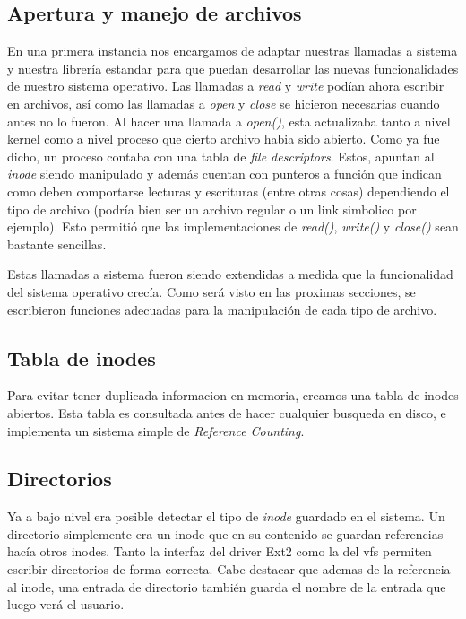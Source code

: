 \documentclass[a4paper,10pt]{article}
\begin{document}
\subsection{Apertura y manejo de archivos}
En una primera instancia nos encargamos de adaptar nuestras llamadas a sistema y nuestra librería estandar
para que puedan desarrollar las nuevas funcionalidades de nuestro sistema operativo.
Las llamadas a \textit{read} y \textit{write} podían ahora escribir en archivos, así como las llamadas a \textit{open} y \textit{close} se hicieron
necesarias cuando antes no lo fueron.
Al hacer una llamada a \textit{open()}, esta actualizaba tanto a nivel kernel como a nivel proceso que cierto archivo habia sido abierto. 
Como ya fue dicho, un proceso contaba con una tabla de \textit{file descriptors}. 
Estos, apuntan al \textit{inode} siendo manipulado y además cuentan con punteros a función que indican como deben comportarse lecturas y escrituras (entre otras cosas) dependiendo el tipo de archivo 
(podría bien ser un archivo regular o un link simbolico por ejemplo). 
Esto permitió que las implementaciones de \textit{read()}, \textit{write()} y \textit{close()} sean bastante sencillas. 
    
Estas llamadas a sistema fueron siendo extendidas a medida que la funcionalidad del sistema operativo crecía. 
Como será visto en las proximas secciones, se escribieron funciones adecuadas para la manipulación de cada tipo de archivo.

\subsection{Tabla de inodes}
Para evitar tener duplicada informacion en memoria, creamos una tabla de inodes abiertos.
Esta tabla es consultada antes de hacer cualquier busqueda en disco, e implementa un sistema simple de \textit{Reference Counting}.

\subsection{Directorios}

Ya a bajo nivel era posible detectar el tipo de \textit{inode} guardado en el sistema. Un directorio simplemente era
un inode que en su contenido se guardan referencias hacía otros inodes. Tanto la interfaz del driver Ext2 como la del
vfs permiten escribir directorios de forma correcta. Cabe destacar que ademas de la referencia al inode, una entrada
de directorio también guarda el nombre de la entrada que luego verá el usuario.
\end{document}
